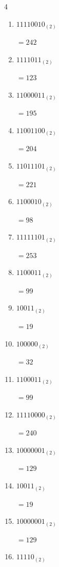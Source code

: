 \begin{multicols}{4}
\begin{enumerate}
        $=250$

  \item $11110010_{(2)}$

        $=242$

  \item $1111011_{(2)}$

        $=123$

\columnbreak %

  \item $11000011_{(2)}$

        $=195$

  \item $11001100_{(2)}$

        $=204$

  \item $11011101_{(2)}$

        $=221$

  \item $1100010_{(2)}$

        $=98$

  \item $11111101_{(2)}$

        $=253$

  \item $1100011_{(2)}$

        $=99$

  \item $10011_{(2)}$

        $=19$

  \item $100000_{(2)}$

        $=32$

  \item $1100011_{(2)}$

        $=99$

  \item $11110000_{(2)}$

        $=240$

  \item $10000001_{(2)}$

        $=129$

  \item $10011_{(2)}$

        $=19$

  \item $10000001_{(2)}$

        $=129$

  \item $11110_{(2)}$


\end{enumerate}
\end{multicols}
